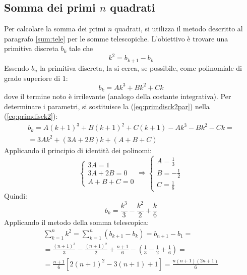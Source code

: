 \subsection{Somma dei primi \texorpdfstring{$n$}{n} quadrati}
Per calcolare la somma dei primi $n$ quadrati, si utilizza il metodo descritto al paragrafo \ref{sum:tele} per le somme telescopiche. L'obiettivo è trovare una primitiva discreta $b_k$ tale che
\begin{equation}
	\label{eq:primdisck2}
	k^2=b_{k+1}-b_k
\end{equation}
Essendo $b_n$ la primitiva discreta, la si cerca, se possibile, come polinomiale di grado superiore di $1$:
\begin{equation}
	\label{eq:primdisck2par}
	b_k=Ak^3+Bk^2+Ck
\end{equation}
dove il termine noto è irrilevante (analogo della costante integrativa). Per determinare i parametri, si sostituisce la (\ref{eq:primdisck2par}) nella (\ref{eq:primdisck2}):
\begin{gather*}
	b_k=A(k+1)^3+B(k+1)^2+C(k+1)-Ak^3-Bk^2-Ck=\\
	=3Ak^2+(3A+2B)k+(A+B+C)
\end{gather*}
Applicando il principio di identità dei polinomi:
\[
	\begin{cases}
		3A=1    \\
		3A+2B=0 \\
		A+B+C=0
	\end{cases}\Rightarrow
	\begin{cases}
		A=\frac{1}{3}  \\
		B=-\frac{1}{2} \\
		C=\frac{1}{6}
	\end{cases}
\]
Quindi:
\[
	b_k=\frac{k^3}{3}-\frac{k^2}{2}+\frac{k}{6}
\]
Applicando il metodo della somma telescopica:
\begin{gather*}
	\sum_{k=1}^n k^2=\sum_{k=1}^n(b_{k+1}-b_k)=b_{n+1}-b_1=\\[1ex]
	=\frac{(n+1)^3}{3}-\frac{(n+1)^2}{2}+\frac{n+1}{6}-\left(\frac{1}{3}-\frac{1}{2}+\frac{1}{6}\right)=\\[1ex]
	=\frac{n+1}{6}[2(n+1)^2-3(n+1)+1]=\frac{n(n+1)(2n+1)}{6}
\end{gather*}
